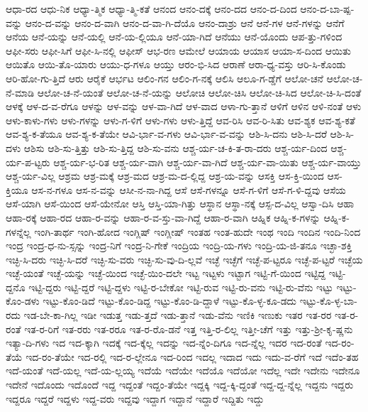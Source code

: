 {ಆಧಾ-ರದ
ಆಧು-ನಿಕ
ಆಧ್ಯಾ-ತ್ಮಿಕ
ಆಧ್ಯಾ-ತ್ಮಿ-ಕತೆ
ಆನಂದ
ಆನಂ-ದಕ್ಕೆ
ಆನಂ-ದದ
ಆನಂ-ದ-ದಿಂದ
ಆನಂ-ದ-ಬಾ-ಷ್ಪ-ವನ್ನು
ಆನಂ-ದ-ವನ್ನು
ಆನಂ-ದ-ವಾಗಿ
ಆನಂ-ದ-ವಾ-ಗಿ-ದೆಯೊ
ಆನಂ-ದಾಶ್ರು
ಆನೆ
ಆನೆ-ಗಳ
ಆನೆ-ಗಳನ್ನು
ಆನೆಗೆ
ಆನೆಯ
ಆನೆ-ಯನ್ನು
ಆನೆ-ಯಲ್ಲಿ
ಆನೆ-ಯ-ಲ್ಲಿಯೂ
ಆನೆ-ಯಾ-ಗಿದೆ
ಆನೆಯು
ಆನೆ-ಯೊಂದು
ಆಪ-ತ್ತು-ಗಳಿಂದ
ಆಫೀ-ಸರು
ಆಫೀ-ಸಿಗೆ
ಆಫೀ-ಸಿ-ನಲ್ಲಿ
ಆಫೀಸ್
ಆಭ-ರಣ
ಆಮೇಲೆ
ಆಯಾಯ
ಆಯಾಸ
ಆಯಾ-ಸ-ದಿಂದ
ಆಯಿತು
ಆಯಿತೊ
ಆಯಿ-ತೊ-ಯಾರು
ಆಯು-ಧ-ಗಳೂ
ಆಯ್ತು
ಆರಂ-ಭಿ-ಸಿದ
ಆರಾಣೆ
ಆರಾ-ಧ್ಯ-ವಸ್ತು
ಆರಿ-ಸಿ-ಕೊಂಡು
ಆರಿ-ಹೋ-ಗು-ತ್ತಿದೆ
ಆರು
ಆರೈಕೆ
ಆರ್ಭಟ
ಆಲಿಂ-ಗನ
ಆಲಿಂ-ಗ-ನಕ್ಕೆ
ಆಲಿಸಿ
ಆಲೂ-ಗ-ಡ್ಡೆಗೆ
ಆಲೋ-ಚನೆ
ಆಲೋ-ಚ-ನೆ-ಮಾಡಿ
ಆಲೋ-ಚ-ನೆ-ಯಂತೆ
ಆಲೋ-ಚ-ನೆ-ಯನ್ನು
ಆಲೋಚಿ
ಆಲೋ-ಚಿಸಿ
ಆಲೋ-ಚಿ-ಸಿದ
ಆಲೋ-ಚಿ-ಸಿ-ದಂತೆ
ಆಳಕ್ಕೆ
ಆಳ-ದ-ವ-ರೆಗೂ
ಆಳನ್ನು
ಆಳ-ವನ್ನು
ಆಳ-ವಾ-ಗಿದೆ
ಆಳ-ವಾದ
ಆಳಾ-ಗು-ತ್ತಾನೆ
ಆಳಿಗೆ
ಆಳಿನ
ಆಳಿ-ನಂತೆ
ಆಳು
ಆಳು-ಕಾಳು-ಗಳು
ಆಳು-ಗಳನ್ನು
ಆಳು-ಗ-ಳಿಗೆ
ಆಳು-ಗಳು
ಆಳು-ತ್ತಿದ್ದೆ
ಆವ-ರಿಸಿ
ಆವ-ರಿ-ಸಿತು
ಆವ-ಶ್ಯಕ
ಆವ-ಶ್ಯ-ಕತೆ
ಆವ-ಶ್ಯ-ಕ-ತೆಯೂ
ಆವ-ಶ್ಯ-ಕ-ತೆಯೇ
ಆವಿ-ರ್ಭಾ-ವ-ಗಳು
ಆವಿ-ರ್ಭಾ-ವ-ವನ್ನು
ಆಶಿ-ಸಿ-ದನು
ಆಶಿ-ಸಿ-ದರೆ
ಆಶಿ-ಸಿ-ದಳು
ಆಶಿಸು
ಆಶಿ-ಸು-ತ್ತಿತ್ತು
ಆಶಿ-ಸು-ತ್ತಿದ್ದ
ಆಶಿ-ಸು-ವನು
ಆಶ್ಚ-ರ್ಯ-ಚ-ಕಿ-ತ-ರಾ-ದರು
ಆಶ್ಚ-ರ್ಯ-ದಿಂದ
ಆಶ್ಚ-ರ್ಯ-ಪ-ಟ್ಟರು
ಆಶ್ಚ-ರ್ಯ-ಭ-ರಿತ
ಆಶ್ಚ-ರ್ಯ-ವಾಗಿ
ಆಶ್ಚ-ರ್ಯ-ವಾ-ಗಿದೆ
ಆಶ್ಚ-ರ್ಯ-ವಾ-ಯಿತು
ಆಶ್ಚ-ರ್ಯ-ವಾಯ್ತು
ಆಶ್ಚ-ರ್ಯ-ವಿಲ್ಲ
ಆಶ್ರಮ
ಆಶ್ರ-ಮಕ್ಕೆ
ಆಶ್ರ-ಮದ
ಆಶ್ರ-ಮ-ದ-ಲ್ಲಿದ್ದ
ಆಶ್ರ-ಯ-ವನ್ನು
ಆಸಕ್ತಿ
ಆಸ-ಕ್ತಿ-ಯಿಂದ
ಆಸ-ಕ್ತಿಯೂ
ಆಸ-ನ-ಗಳೂ
ಆಸ-ನ-ವನ್ನು
ಆಸೀ-ನ-ನಾ-ಗಿದ್ದ
ಆಸೆ
ಆಸೆ-ಗಳನ್ನೂ
ಆಸೆ-ಗ-ಳಿಗೆ
ಆಸೆ-ಗ-ಳಿ-ದ್ದವು
ಆಸೆಯ
ಆಸೆ-ಯಾಗಿ
ಆಸೆ-ಯಿಂದ
ಆಸೆ-ಯೇನೋ
ಆಸ್ತಿ
ಆಸ್ತಿ-ಯಾ-ಗಿತ್ತು
ಆಸ್ಥಾನ
ಆಸ್ಥಾ-ನಕ್ಕೆ
ಆಸ್ಪ-ದ-ವಿಲ್ಲ
ಆಸ್ವಾ-ದಿಸಿ
ಆಹಾ
ಆಹಾ-ರಕ್ಕೆ
ಆಹಾ-ರದ
ಆಹಾ-ರ-ವನ್ನು
ಆಹಾ-ರ-ವ-ಸ್ತು-ವಾ-ಗಿದ್ದೆ
ಆಹಾ-ರ-ವಾಗಿ
ಆಹ್ನಿಕ
ಆಹ್ನಿ-ಕ-ಗಳನ್ನು
ಆಹ್ನಿ-ಕ-ಗಳನ್ನೆಲ್ಲ
ಇಂಗಿ-ತಾರ್ಥ
ಇಂಗಿ-ಹೋದ
ಇಂಗ್ಲಿಷ್
ಇಂಗ್ಲೀಷ್
ಇಂತಹ
ಇಂತ-ಹುದೇ
ಇಂಥ
ಇಂದಿ
ಇಂದಿನ
ಇಂದಿ-ನಿಂದ
ಇಂದ್ರ
ಇಂದ್ರ-ಧ-ನು-ಸ್ಸನ್ನು
ಇಂದ್ರ-ನಿಗೆ
ಇಂದ್ರ-ನಿ-ಗೇಕೆ
ಇಂದ್ರಿಯ
ಇಂದ್ರಿ-ಯ-ಗಳು
ಇಂದ್ರಿ-ಯ-ಜಿ-ತನೂ
ಇಚ್ಛಾ-ಶಕ್ತಿ
ಇಚ್ಛಿ-ಸಿ-ದರು
ಇಚ್ಛಿ-ಸಿ-ದರೆ
ಇಚ್ಛಿ-ಸು-ವರು
ಇಚ್ಛಿ-ಸು-ವು-ದಿ-ಲ್ಲವೆ
ಇಚ್ಛೆ
ಇಚ್ಛೆಗೆ
ಇಚ್ಛೆ-ಪ-ಟ್ಟರೂ
ಇಚ್ಛೆ-ಪ-ಟ್ಟರೆ
ಇಚ್ಛೆಯ
ಇಚ್ಛೆ-ಯಂತೆ
ಇಚ್ಛೆ-ಯನ್ನು
ಇಚ್ಛೆ-ಯಿಂದ
ಇಚ್ಛೆ-ಯಿಂ-ದಲೇ
ಇಟ್ಟ
ಇಟ್ಟಳು
ಇಟ್ಟಾಗ
ಇಟ್ಟಿ-ಗೆ-ಯಿಂದ
ಇಟ್ಟಿದ್ದ
ಇಟ್ಟಿ-ದ್ದನೊ
ಇಟ್ಟಿ-ದ್ದರು
ಇಟ್ಟಿ-ದ್ದರೆ
ಇಟ್ಟಿ-ದ್ದಳು
ಇಟ್ಟಿ-ರ-ಬೇಕೋ
ಇಟ್ಟಿ-ರುವ
ಇಟ್ಟಿ-ರು-ವನು
ಇಟ್ಟಿ-ರು-ವೆನು
ಇಟ್ಟು
ಇಟ್ಟು-ಕೊಂ-ಡಳು
ಇಟ್ಟು-ಕೊಂ-ಡಿದೆ
ಇಟ್ಟು-ಕೊಂ-ಡಿದ್ದ
ಇಟ್ಟು-ಕೊಂ-ಡಿ-ದ್ದಾಳೆ
ಇಟ್ಟು-ಕೊ-ಳ್ಳ-ಕೂ-ಡದು
ಇಟ್ಟು-ಕೊ-ಳ್ಳ-ಬಾ-ರದು
ಇಡ-ಬೇ-ಕಾ-ಗಿಲ್ಲ
ಇಡೀ
ಇಡುತ್ತ
ಇಡು-ತ್ತದೆ
ಇಡು-ತ್ತಾನೆ
ಇಡು-ವೆನು
ಇಣಿಕಿ
ಇಣುಕು
ಇತರ
ಇತ-ರರ
ಇತ-ರ-ರಂತೆ
ಇತ-ರ-ರಿಗೆ
ಇತ-ರರು
ಇತ-ರರೂ
ಇತ-ರ-ರೊ-ಡನೆ
ಇತ್ತ
ಇತ್ತಿ-ರ-ಲಿಲ್ಲ
ಇತ್ತೀ-ಚೆಗೆ
ಇತ್ತು
ಇತ್ತು-ಶ್ರೀ-ಕೃ-ಷ್ಣನು
ಇತ್ಯಾ-ದಿ-ಗಳು
ಇದ
ಇದ-ಕ್ಕಾಗಿ
ಇದಕ್ಕೆ
ಇದ-ಕ್ಕೆಲ್ಲ
ಇದನ್ನು
ಇದ-ನ್ನೆಂ-ದಿಗೂ
ಇದ-ನ್ನೆಲ್ಲ
ಇದರ
ಇದ-ರಂತೆ
ಇದ-ರಂ-ತೆಯೆ
ಇದ-ರಂ-ತೆಯೇ
ಇದ-ರಲ್ಲಿ
ಇದ-ರ-ಲ್ಲೇನೂ
ಇದ-ರಿಂದ
ಇದಲ್ಲ
ಇದಾದ
ಇದು
ಇದು-ವ-ರೆಗೆ
ಇದೆ
ಇದೆಂ-ತಹ
ಇದೆ-ಯಂತೆ
ಇದೆ-ಯಲ್ಲ
ಇದೆ-ಯ-ಲ್ಲಯ್ಯ
ಇದೆಯೆ
ಇದೆಯೇ
ಇದೆಯೊ
ಇದೆಯೋ
ಇದೆಲ್ಲ
ಇದೇ
ಇದೇನು
ಇದೇನೂ
ಇದೇನೆ
ಇದೊಂದು
ಇದೊಂದೆ
ಇದ್ದ
ಇದ್ದಂತೆ
ಇದ್ದಂ-ತೆಯೇ
ಇದ್ದಕ್ಕಿ
ಇದ್ದ-ಕ್ಕಿ-ದ್ದಂತೆ
ಇದ್ದ-ದ್ದ-ನ್ನೆಲ್ಲ
ಇದ್ದನು
ಇದ್ದರು
ಇದ್ದರೂ
ಇದ್ದರೆ
ಇದ್ದಳು
ಇದ್ದ-ವರು
ಇದ್ದವು
ಇದ್ದಾಗ
ಇದ್ದಾನೆ
ಇದ್ದಾರೆ
ಇದ್ದಿತು
ಇದ್ದು
}
